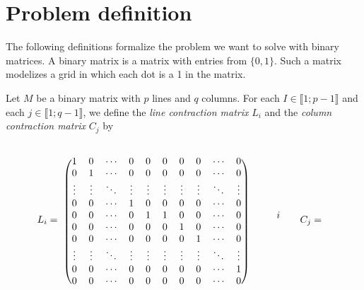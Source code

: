 \section{Problem definition}\label{sec:problemdef}

The following definitions formalize the problem we want to solve with binary matrices. A binary matrix is a matrix with entries from $\{0,1\}$. Such a matrix modelizes a grid in which each dot is a 1 in the matrix.

\begin{definition}
Let $M$ be a binary matrix with $p$ lines and $q$ columns. For each $I \in \llbracket 1; p-1 \rrbracket$ and each $j \in \llbracket 1; q-1 \rrbracket$, we define the \emph{line contraction matrix} $L_i$ and the \emph{column contraction matrix} $C_j$ by 

$$L_i = \hspace{0.2cm}\begin{blockarray}{ccccccccccccc}
& & & & & & & & & & &\\
\begin{block}{(cccccccccc)ccc}
1      &  0     & \cdots & 0      & 0 & 0 &  0  & 0 & \cdots & 0 &&&\\
0      &  1     & \cdots & 0      & 0 & 0 &  0  & 0 & \cdots & 0 &&&\\
\vdots & \vdots & \ddots & \vdots & \vdots & \vdots &  \vdots  & \vdots & \ddots  & \vdots  &&&\\
0      &   0    &\cdots  & 1      & 0 & 0 &  0  & 0 & \cdots & 0 &&&\\ 
0      &   0    &\cdots  & 0      & 1 & 1 &  0  & 0 & \cdots & 0 & && i\\ 
0      &   0    &\cdots  & 0      & 0 & 0 &  1  & 0 & \cdots & 0 &&&\\
0      &   0    &\cdots  & 0      & 0 & 0 &  0  & 1 & \cdots & 0 &&&\\ 
\vdots      &   \vdots    &\ddots  & \vdots     & \vdots & \vdots & \vdots & \vdots & \ddots & \vdots  &&&\\
0      &   0    &\cdots  & 0      & 0 & 0  &  0 & 0 & \cdots & 1 &&&\\
0      &   0    &\cdots  & 0      & 0 & 0      &   0    & 0      &\cdots  & 0 &&&\\
\end{block}
\end{blockarray}
\hspace{0.5cm}
C_j = \hspace{0.2cm}\begin{blockarray}{ccccccccccc}

\end{blockarray}$$
\end{definition}
